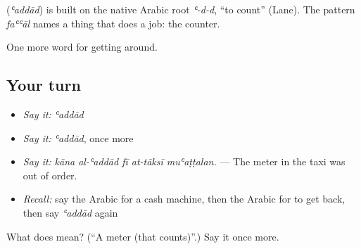 \begin{cousinweb}
\textbf{} (\emph{ʿaddād}) is built on the native Arabic root \emph{ʿ-d-d}, \textquotedblleft{}to count\textquotedblright{} (Lane). The pattern \emph{faʿʿāl} names a thing that does a job: the counter.
\end{cousinweb}

\begin{grammarlens}[title={What you've built}]
One more word for getting around.
\end{grammarlens}

\subsection*{Your turn}
\begin{itemize}
\raggedright
  \item \emph{Say it:} \emph{ʿaddād}
  \item \emph{Say it:} \emph{ʿaddād}, once more
  \item \emph{Say it:} \emph{kāna al-ʿaddād fī at-tāksī muʿaṭṭalan.} — The meter in the taxi was out of order.
  \item \emph{Recall:} say the Arabic for a cash machine, then the Arabic for to get back, then say \emph{ʿaddād} again
\end{itemize}

\begin{tcolorbox}[breakable,colback=teal!4,colframe=teal!35!black,title={Before you move on}]
What does  mean? (\textquotedblleft{}A meter (that counts)\textquotedblright{}.) Say it once more.
\end{tcolorbox}
